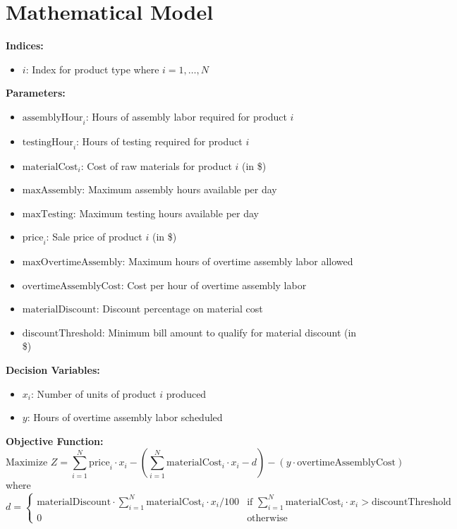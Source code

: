 \documentclass{article}
\begin{document}
\section*{Mathematical Model}

\textbf{Indices:}
\begin{itemize}
    \item \( i \): Index for product type where \( i = 1, \ldots, N \)
\end{itemize}

\textbf{Parameters:}
\begin{itemize}
    \item \( \text{assemblyHour}_i \): Hours of assembly labor required for product \( i \)
    \item \( \text{testingHour}_i \): Hours of testing required for product \( i \)
    \item \( \text{materialCost}_i \): Cost of raw materials for product \( i \) (in \$)
    \item \( \text{maxAssembly} \): Maximum assembly hours available per day
    \item \( \text{maxTesting} \): Maximum testing hours available per day
    \item \( \text{price}_i \): Sale price of product \( i \) (in \$)
    \item \( \text{maxOvertimeAssembly} \): Maximum hours of overtime assembly labor allowed
    \item \( \text{overtimeAssemblyCost} \): Cost per hour of overtime assembly labor
    \item \( \text{materialDiscount} \): Discount percentage on material cost
    \item \( \text{discountThreshold} \): Minimum bill amount to qualify for material discount (in \$)
\end{itemize}

\textbf{Decision Variables:}
\begin{itemize}
    \item \( x_i \): Number of units of product \( i \) produced
    \item \( y \): Hours of overtime assembly labor scheduled
\end{itemize}

\textbf{Objective Function:}
\[
\text{Maximize } Z = \sum_{i=1}^{N} \text{price}_i \cdot x_i - \left( \sum_{i=1}^{N} \text{materialCost}_i \cdot x_i - d \right) - (y \cdot \text{overtimeAssemblyCost})
\]
where 
\[
d = 
\begin{cases} 
\text{materialDiscount} \cdot \sum_{i=1}^{N} \text{materialCost}_i \cdot x_i / 100 & \text{if } \sum_{i=1}^{N} \text{materialCost}_i \cdot x_i > \text{discountThreshold} \\
0 & \text{otherwise}
\end{cases}
\]
\end{document}
